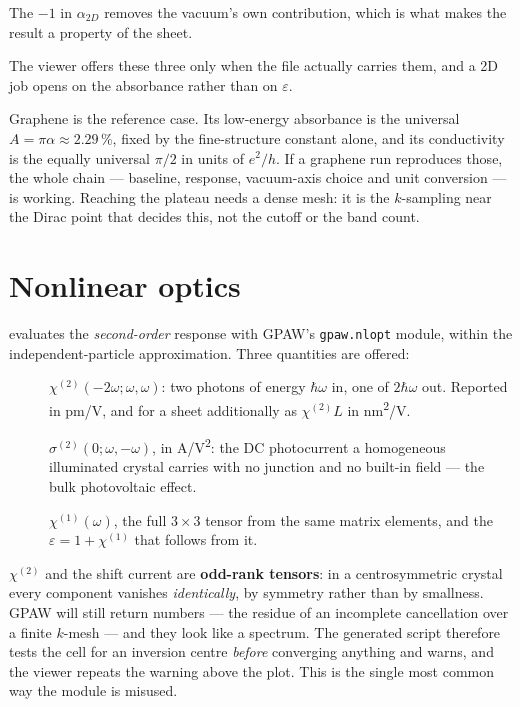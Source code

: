The $-1$ in $\alpha_{2D}$ removes the vacuum's own contribution, which is what
makes the result a property of the sheet.

The viewer offers these three only when the file actually carries them, and a
2D job opens on the absorbance rather than on $\varepsilon$.

\begin{caltip}
Graphene is the reference case. Its low-energy absorbance is the universal
$A = \pi\alpha \approx 2.29\,\%$, fixed by the fine-structure constant alone,
and its conductivity is the equally universal $\pi/2$ in units of $e^2/h$. If a
graphene run reproduces those, the whole chain --- baseline, response,
vacuum-axis choice and unit conversion --- is working. Reaching the plateau
needs a dense mesh: it is the $k$-sampling near the Dirac point that decides
this, not the cutoff or the band count.
\end{caltip}

\section{Nonlinear optics}
\label{sec:nlopt}

\menusep{} evaluates the
\emph{second-order} response with GPAW's \texttt{gpaw.nlopt} module, within the
independent-particle approximation. Three quantities are offered:

\begin{description}
  \item[] $\chi^{(2)}(-2\omega; \omega,
    \omega)$: two photons of energy $\hbar\omega$ in, one of $2\hbar\omega$
    out. Reported in pm/V, and for a sheet additionally as $\chi^{(2)}L$ in
    nm\textsuperscript{2}/V.
  \item[] $\sigma^{(2)}(0; \omega, -\omega)$, in
    A/V\textsuperscript{2}: the DC photocurrent a homogeneous illuminated
    crystal carries with no junction and no built-in field --- the bulk
    photovoltaic effect.
  \item[] $\chi^{(1)}(\omega)$, the full
    $3\times3$ tensor from the same matrix elements, and the
    $\varepsilon = 1 + \chi^{(1)}$ that follows from it.
\end{description}

\begin{calwarn}
$\chi^{(2)}$ and the shift current are \textbf{odd-rank tensors}: in a
centrosymmetric crystal every component vanishes \emph{identically}, by
symmetry rather than by smallness. GPAW will still return numbers --- the
residue of an incomplete cancellation over a finite $k$-mesh --- and they look
like a spectrum. The generated script therefore tests the cell for an inversion
centre \emph{before} converging anything and warns, and the viewer repeats the
warning above the plot. This is the single most common way the module is
misused.
\end{calwarn}

